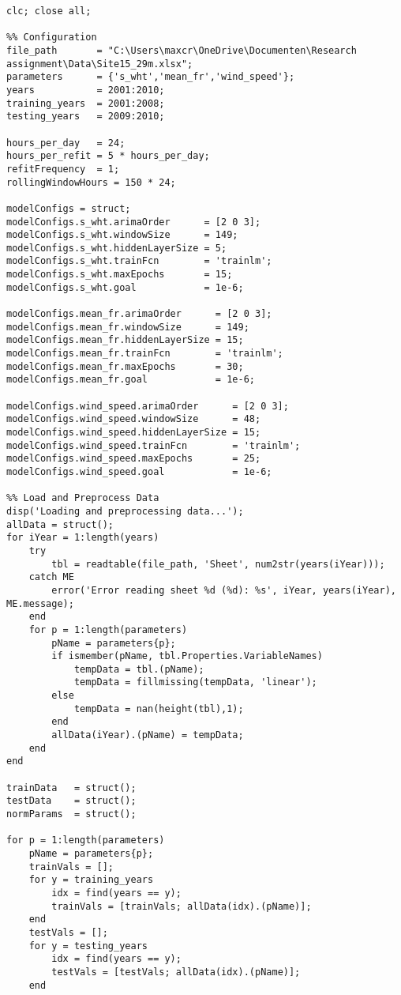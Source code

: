 \label{append:hybrid_script}
\begin{verbatim}
clc; close all;

%% Configuration
file_path       = "C:\Users\maxcr\OneDrive\Documenten\Research assignment\Data\Site15_29m.xlsx";
parameters      = {'s_wht','mean_fr','wind_speed'};
years           = 2001:2010;
training_years  = 2001:2008;
testing_years   = 2009:2010;

hours_per_day   = 24;
hours_per_refit = 5 * hours_per_day;  
refitFrequency  = 1; 
rollingWindowHours = 150 * 24;  

modelConfigs = struct;
modelConfigs.s_wht.arimaOrder      = [2 0 3];
modelConfigs.s_wht.windowSize      = 149;
modelConfigs.s_wht.hiddenLayerSize = 5;
modelConfigs.s_wht.trainFcn        = 'trainlm';
modelConfigs.s_wht.maxEpochs       = 15;
modelConfigs.s_wht.goal            = 1e-6;

modelConfigs.mean_fr.arimaOrder      = [2 0 3];
modelConfigs.mean_fr.windowSize      = 149;
modelConfigs.mean_fr.hiddenLayerSize = 15;
modelConfigs.mean_fr.trainFcn        = 'trainlm';
modelConfigs.mean_fr.maxEpochs       = 30;
modelConfigs.mean_fr.goal            = 1e-6;

modelConfigs.wind_speed.arimaOrder      = [2 0 3];
modelConfigs.wind_speed.windowSize      = 48;
modelConfigs.wind_speed.hiddenLayerSize = 15;
modelConfigs.wind_speed.trainFcn        = 'trainlm';
modelConfigs.wind_speed.maxEpochs       = 25;
modelConfigs.wind_speed.goal            = 1e-6;

%% Load and Preprocess Data
disp('Loading and preprocessing data...');
allData = struct();
for iYear = 1:length(years)
    try
        tbl = readtable(file_path, 'Sheet', num2str(years(iYear)));
    catch ME
        error('Error reading sheet %d (%d): %s', iYear, years(iYear), ME.message);
    end
    for p = 1:length(parameters)
        pName = parameters{p};
        if ismember(pName, tbl.Properties.VariableNames)
            tempData = tbl.(pName);
            tempData = fillmissing(tempData, 'linear');
        else
            tempData = nan(height(tbl),1);
        end
        allData(iYear).(pName) = tempData;
    end
end

trainData   = struct();
testData    = struct();
normParams  = struct();

for p = 1:length(parameters)
    pName = parameters{p};
    trainVals = [];
    for y = training_years
        idx = find(years == y);
        trainVals = [trainVals; allData(idx).(pName)];
    end
    testVals = [];
    for y = testing_years
        idx = find(years == y);
        testVals = [testVals; allData(idx).(pName)];
    end


\end{verbatim}
